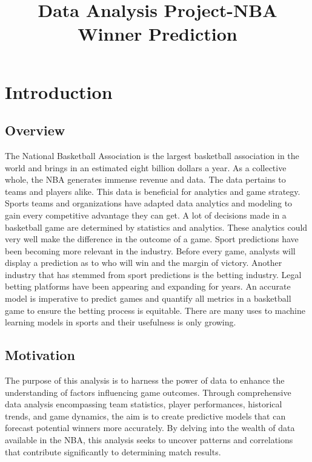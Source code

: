 \documentclass[conference]{IEEEtran}
\begin{document}
\title{Data Analysis Project-NBA Winner Prediction}

\author{
}

\maketitle
\IEEEpeerreviewmaketitle

\section{Introduction}

\subsection{Overview}
The National Basketball Association is the largest basketball association in the world and brings in an estimated eight billion dollars a year. As a collective whole, the NBA generates immense revenue and data. The data pertains to teams and players alike. This data is beneficial for analytics and game strategy. Sports teams and organizations have adapted data analytics and modeling to gain every competitive advantage they can get. A lot of decisions made in a basketball game are determined by statistics and analytics. These analytics could very well make the difference in the outcome of a game. 
Sport predictions have been becoming more relevant in the industry. Before every game, analysts will display a prediction as to who will win and the margin of victory. Another industry that has stemmed from sport predictions is the betting industry. Legal betting platforms have been appearing and expanding for years. An accurate model is imperative to predict games and quantify all metrics in a basketball game to ensure the betting process is equitable. There are many uses to machine learning models in sports and their usefulness is only growing.


\subsection{Motivation}

The purpose of this analysis is to harness the power of data to enhance the understanding of factors influencing game outcomes. Through comprehensive data analysis encompassing team statistics, player performances, historical trends, and game dynamics, the aim is to create predictive models that can forecast potential winners more accurately. By delving into the wealth of data available in the NBA, this analysis seeks to uncover patterns and correlations that contribute significantly to determining match results.
\end{document}
